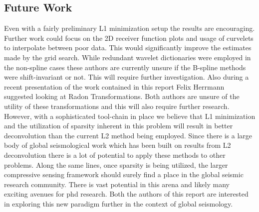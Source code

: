 \documentclass[jgrga]{agutex}
\begin{document}
\begin{article}
\section{Future Work}
Even with a fairly preliminary L1 minimization setup the results are encouraging. Further work could focus on the 2D receiver function plots and usage of curvelets to interpolate between poor data. This would significantly improve the estimates made by the grid search. While redundant wavelet dictionaries were employed in the non-spline cases these authors are currently unsure if the B-spline methods were shift-invariant or not. This will require further investigation. Also during a recent presentation of the work contained in this report Felix Herrmann suggested looking at Radon Transformations. Both authors are unsure of the utility of these transformations and this will also require further research. However, with a sophisticated tool-chain in place we believe that L1 minimization and the utilization of sparsity inherent in this problem will result in better deconvolution than the current L2 method being employed. Since there is a large body of global seismological work which has been built on results from L2 deconvolution there is a lot of potential to apply these methods to other problems. Along the same lines, once sparsity is being utilized, the larger compressive sensing framework should surely find a place in the global seismic research community. There is vast potential in this arena and likely many exciting avenues for phd research. Both the authors of this report are interested in exploring this new paradigm further in the context of global seismology.

%
%
%
%
%
%
%


\end{article}
\end{document}
